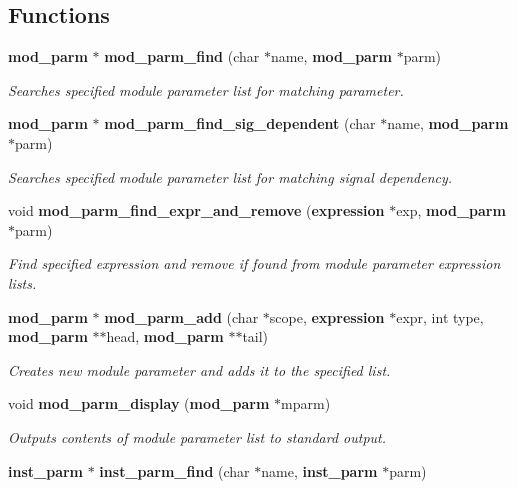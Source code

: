 \subsection*{Functions}
\begin{CompactItemize}
\item 
{\bf mod\_\-parm} $\ast$ {\bf mod\_\-parm\_\-find} (char $\ast$name, {\bf mod\_\-parm} $\ast$parm)
\begin{CompactList}\small\item\em Searches specified module parameter list for matching parameter. \item\end{CompactList}\item 
{\bf mod\_\-parm} $\ast$ {\bf mod\_\-parm\_\-find\_\-sig\_\-dependent} (char $\ast$name, {\bf mod\_\-parm} $\ast$parm)
\begin{CompactList}\small\item\em Searches specified module parameter list for matching signal dependency. \item\end{CompactList}\item 
void {\bf mod\_\-parm\_\-find\_\-expr\_\-and\_\-remove} ({\bf expression} $\ast$exp, {\bf mod\_\-parm} $\ast$parm)
\begin{CompactList}\small\item\em Find specified expression and remove if found from module parameter expression lists. \item\end{CompactList}\item 
{\bf mod\_\-parm} $\ast$ {\bf mod\_\-parm\_\-add} (char $\ast$scope, {\bf expression} $\ast$expr, int type, {\bf mod\_\-parm} $\ast$$\ast$head, {\bf mod\_\-parm} $\ast$$\ast$tail)
\begin{CompactList}\small\item\em Creates new module parameter and adds it to the specified list. \item\end{CompactList}\item 
void {\bf mod\_\-parm\_\-display} ({\bf mod\_\-parm} $\ast$mparm)
\begin{CompactList}\small\item\em Outputs contents of module parameter list to standard output. \item\end{CompactList}\item 
{\bf inst\_\-parm} $\ast$ {\bf inst\_\-parm\_\-find} (char $\ast$name, {\bf inst\_\-parm} $\ast$parm)

\end{CompactItemize}

